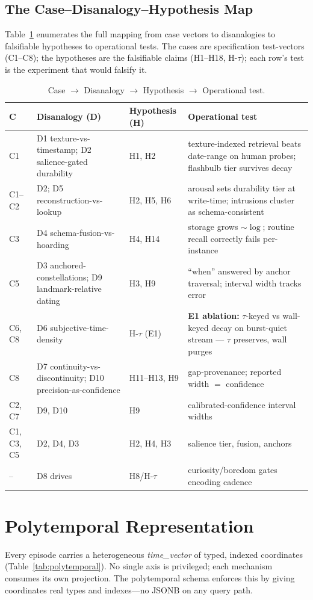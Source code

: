 \documentclass[letterpaper]{article}
\begin{document}
\subsection{The Case--Disanalogy--Hypothesis Map}
Table~\ref{tab:cdh} enumerates the full mapping from case vectors to
disanalogies to falsifiable hypotheses to operational tests. The cases are
specification test-vectors (C1--C8); the hypotheses are the falsifiable claims
(H1--H18, H-$\tau$); each row's test is the experiment that would falsify it.

\begin{table}[t]\centering\small
\caption{Case $\to$ Disanalogy $\to$ Hypothesis $\to$ Operational test.}
\label{tab:cdh}
\begin{tabular}{@{}p{0.8cm}p{2.4cm}p{5.2cm}p{5.2cm}@{}}
\toprule
C & Disanalogy (D) & Hypothesis (H) & Operational test \\
\midrule
C1 & D1 texture-vs-timestamp; D2 salience-gated durability & H1, H2 &
    texture-indexed retrieval beats date-range on human probes;
    flashbulb tier survives decay \\
C1--C2 & D2; D5 reconstruction-vs-lookup & H2, H5, H6 &
    arousal sets durability tier at write-time; intrusions cluster as
    schema-consistent \\
C3 & D4 schema-fusion-vs-hoarding & H4, H14 & storage grows $\sim\log$;
    routine recall correctly fails per-instance \\
C5 & D3 anchored-constellations; D9 landmark-relative dating & H3, H9 &
    ``when'' answered by anchor traversal; interval width tracks error \\
C6, C8 & D6 subjective-time-density & H-$\tau$ (E1) &
    \textbf{E1 ablation:} $\tau$-keyed vs wall-keyed decay on
    burst-quiet stream --- $\tau$ preserves, wall purges \\
C8 & D7 continuity-vs-discontinuity; D10 precision-as-confidence &
    H11--H13, H9 & gap-provenance; reported width $=$ confidence \\
C2, C7 & D9, D10 & H9 & calibrated-confidence interval widths \\
C1, C3, C5 & D2, D4, D3 & H2, H4, H3 & salience tier, fusion, anchors \\
-- & D8 drives & H8/H-$\tau$ & curiosity/boredom gates encoding cadence \\
\bottomrule
\end{tabular}
\end{table}

\section{Polytemporal Representation}\label{sec:poly}
Every episode carries a heterogeneous \emph{time\_vector} of typed, indexed coordinates (Table~\ref{tab:polytemporal}). No single axis is privileged; each mechanism consumes its own projection. The polytemporal schema enforces this by giving coordinates real types and indexes---no JSONB on any query path.
\end{document}
